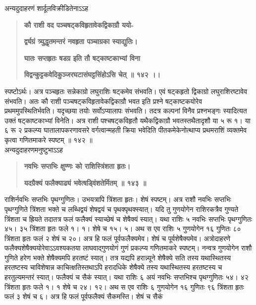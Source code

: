 \documentclass[11pt, openany]{book}
\begin{document}
\begin{sloppypar}
\hangindent=0.2in \hspace{0.2in}अन्यदुदाहरणं शार्दूलविक्रीडितेनाऽऽह\textendash

\begin{quote}
\hspace{1in}\textbf{कौ राशी वद पञ्चषट्कविहृतावेकद्विकाग्रौ ययो-}

\hspace{1in}\textbf{र्द्व्यग्रं त्र्युद्धृतमन्तरं नवहृता पञ्चाग्रका स्याद्युतिः।}

\hspace{1in}\textbf{घातः सप्तहृतः षडग्र इति तौ षट्काष्टकाभ्यां विना}

\hspace{1in}\textbf{विद्वन्कुट्टकवेदिकुञ्जरघटासंघट्टसिंहोऽसि चेत् ॥ १४२ ।।}
\end{quote}

\hangindent=0.2in \hspace{0.2in}स्पष्टोऽर्थः। अत्र पञ्चहृतः सन्नेकाग्रो लघुराशिः षट्कमेव संभवति। एवं षट्कहृतो द्विकाग्रो लघुराशिरष्टावेव संभवति। अतः कौ राशी पञ्चषट्कविहृतावेकद्विकाग्रौ भवत इति प्रश्ने षट्काष्टकयोरेव प्रथममुपस्थितिर्भवति। यदृच्छया तयोः सर्वोऽप्यालापः संभवति। तदत्र कल्पनां विनैव प्रश्नभङ्गः स्यादित्यत उक्तं षट्काष्टकाभ्यां विनेति। अत्र राशी पश्चषट्कविहृतौ यथैकद्विकाग्रौ भवतस्तथैतादृशौ या ५ रू १। या ६ रू २ प्रकल्प्य घातालापकरणावसरे वर्गत्वान्महती क्रिया भवेदिति पीतकमेकेनोत्थाप्य प्रथमराशिं व्यक्तमेव कृत्वा गणितमाकरे स्पष्टम् ॥ १४२ ॥\\

\hangindent=0.2in \hspace{0.2in}अन्यदुदाहरणमनुष्टुभाऽऽह\textendash

\begin{quote}
\hspace{1in}\textbf{नवभिः सप्तभिः क्षुण्णः को राशिस्त्रिंशता हृतः।}

\hspace{1in}\textbf{यदग्रैक्यं फलैक्याढ्यं भवेत्षड्विंशतेर्मितम् ॥ १४३ ॥}
\end{quote}

\hangindent=0.2in \hspace{0.2in}राशिर्नवभिः सप्तभिः पृथग्गुणितः। उभयत्रापि त्रिंशता हृतः। शेषं स्पष्टम्। अत्र राशौ नवभिः सप्तभिः पृथग्गुणिते त्रिंशता भक्ते च लब्धिद्वयं शेषद्वयं च पृथक्पृथक्स्यात्। यदि तु गुणयोगेन राशिरकत्रैव गुण्यते त्रिंशता च ह्रियते तदातत्र फलं फलैक्यं स्याच्छेषं च शेषैक्यं स्यात्। यथा राशिः ५ नवभिः सप्तभिः पृथग्गुणितः ४५। ३५ त्रिंशता हृतः फले १। १। शेषे च १५। ५। अथ स एव राशिः ५ गुणयोगेन १६ गुणितः ८० त्रिंशता हृतः फलं २ शेषं च २०। अत्र हि फलं पूर्वफलैक्यमेव। शेषं च पूर्वशेषैक्यमेव। अत्रोदाहरणे फलैक्यशेषैक्ययोरेवाऽऽवश्यकतया लाघवाद्गुणयोगं गुणं प्रकल्प्य गणितमाकरे स्पष्टम्। नन्वत्र गुणयोगेन राशौ गुणिते हरेण भक्ते शेषैक्यमपि हरतष्टं स्यात्। तत्र यद्यपि हरान्न्यूने शेषैक्ये सति तस्य यथास्थितस्य हरतष्टस्य चाविशेषान्न काचित्क्षतिस्तथाऽपि हरादधिके शेषैक्ये तस्य यथास्थितस्य हरतष्टस्य च हरतुल्यमन्तरं स्यात्। फलैक्यं च सैकं स्यात्। यथा राशिः ६ अयं नवभिः सप्तभिश्च पृथग्गुणितः ५४। ४२ त्रिंशता हृतः फले १। १ शेषे च २४। १२। अथ स एव राशिः ६ गुणयोगेन १६ गुणितः ९६ त्रिंशता हृतः फलं ३ शेषं च ६। अत्र हि फलं पूर्वफलैक्यं सैकमस्ति। शेषं च सैकं
\end{sloppypar}
\thispagestyle{empty}
\newpage
\end{document}
